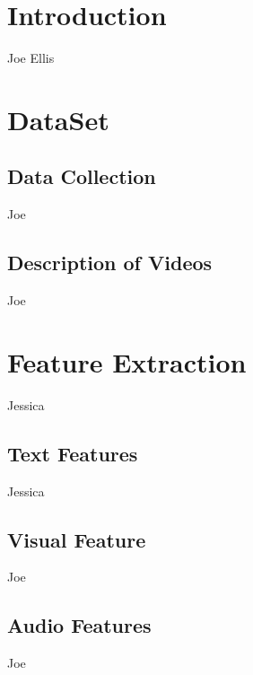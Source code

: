 \documentclass[twoside]{article}
\begin{document}
\begin{multicols}{2} %

\section{Introduction}
Joe Ellis


\section{DataSet}

\subsection{Data Collection}
Joe 

\subsection{Description of Videos}
Joe 




\section{Feature Extraction}
Jessica

\subsection{Text Features}
Jessica

\subsection{Visual Feature}
Joe

\subsection{Audio Features}
Joe


\end{multicols}
\end{document}
